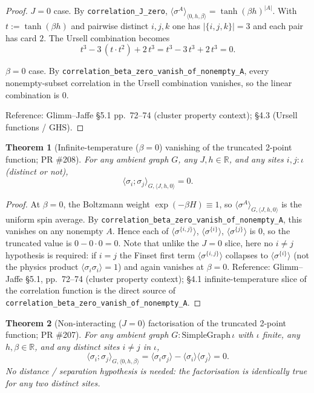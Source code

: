 \documentclass[a4paper,11pt]{article}
\newtheorem{theorem}{Theorem}
\begin{document}
\begin{proof}
$J = 0$ case. By \texttt{correlation\_J\_zero},
$\langle \sigma^A \rangle_{\langle 0,h,\beta\rangle} =
\tanh(\beta h)^{|A|}$. With $t := \tanh(\beta h)$ and pairwise
distinct $i, j, k$ one has $|\{i,j,k\}| = 3$ and each pair has
card $2$. The Ursell combination becomes
\[
  t^3 - 3\,(t \cdot t^2) + 2\,t^3
  = t^3 - 3\,t^3 + 2\,t^3 = 0.
\]

$\beta = 0$ case. By
\texttt{correlation\_beta\_zero\_vanish\_of\_nonempty\_A}, every
nonempty-subset correlation in the Ursell combination vanishes,
so the linear combination is $0$.

Reference: Glimm--Jaffe \cite{glimm-jaffe} \S 5.1 pp.~72--74
(cluster property context); \S 4.3 (Ursell functions / GHS).
\end{proof}

\begin{theorem}[Infinite-temperature ($\beta=0$) vanishing of the
truncated 2-point function; PR \#208]
For any ambient graph $G$, any $J, h \in \mathbb{R}$, and any sites
$i, j : \iota$ (distinct or not),
\[
  \langle \sigma_i; \sigma_j \rangle_{G,\langle J,h,0\rangle} = 0.
\]
\end{theorem}

\begin{proof}
At $\beta = 0$, the Boltzmann weight $\exp(-\beta H) \equiv 1$, so
$\langle \sigma^A \rangle_{G,\langle J,h,0\rangle}$ is the uniform
spin average. By
\texttt{correlation\_beta\_zero\_vanish\_of\_nonempty\_A}, this
vanishes on any nonempty $A$. Hence each of
$\langle\sigma^{\{i,j\}}\rangle$,
$\langle\sigma^{\{i\}}\rangle$, $\langle\sigma^{\{j\}}\rangle$
is $0$, so the truncated value is $0 - 0 \cdot 0 = 0$.
Note that unlike the $J = 0$ slice, here no $i \neq j$ hypothesis
is required: if $i = j$ the Finset first term
$\langle\sigma^{\{i,j\}}\rangle$ collapses to
$\langle\sigma^{\{i\}}\rangle$ (not the physics product
$\langle\sigma_i\sigma_i\rangle = 1$) and again vanishes at
$\beta = 0$.
Reference: Glimm--Jaffe \cite{glimm-jaffe} \S 5.1,
pp.~72--74 (cluster property context); §4.1 infinite-temperature
slice of the correlation function is the direct source of
\texttt{correlation\_beta\_zero\_vanish\_of\_nonempty\_A}.
\end{proof}

\begin{theorem}[Non-interacting ($J=0$) factorisation of the
truncated 2-point function; PR \#207]
For any ambient graph $G : \mathrm{SimpleGraph}\, \iota$ with
$\iota$ finite, any $h, \beta \in \mathbb{R}$, and any distinct
sites $i \neq j$ in $\iota$,
\[
  \langle \sigma_i; \sigma_j \rangle_{G,\langle 0,h,\beta\rangle}
  = \langle \sigma_i \sigma_j \rangle - \langle \sigma_i\rangle
  \langle \sigma_j \rangle = 0.
\]
No distance / separation hypothesis is needed: the
factorisation is identically true for any two distinct sites.
\end{theorem}
\end{document}
